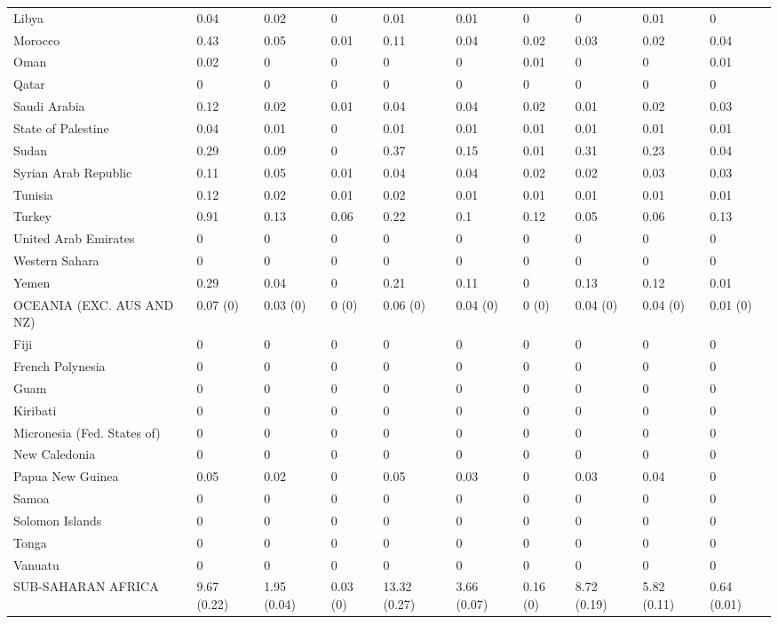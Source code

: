 \begin{longtable}[t]{llllllllll}
Libya & 0.04 & 0.02 & 0 & 0.01 & 0.01 & 0 & 0 & 0.01 & 0\\
Morocco & 0.43 & 0.05 & 0.01 & 0.11 & 0.04 & 0.02 & 0.03 & 0.02 & 0.04\\
Oman & 0.02 & 0 & 0 & 0 & 0 & 0.01 & 0 & 0 & 0.01\\
Qatar & 0 & 0 & 0 & 0 & 0 & 0 & 0 & 0 & 0\\
Saudi Arabia & 0.12 & 0.02 & 0.01 & 0.04 & 0.04 & 0.02 & 0.01 & 0.02 & 0.03\\
State of Palestine & 0.04 & 0.01 & 0 & 0.01 & 0.01 & 0.01 & 0.01 & 0.01 & 0.01\\
Sudan & 0.29 & 0.09 & 0 & 0.37 & 0.15 & 0.01 & 0.31 & 0.23 & 0.04\\
Syrian Arab Republic & 0.11 & 0.05 & 0.01 & 0.04 & 0.04 & 0.02 & 0.02 & 0.03 & 0.03\\
Tunisia & 0.12 & 0.02 & 0.01 & 0.02 & 0.01 & 0.01 & 0.01 & 0.01 & 0.01\\
Turkey & 0.91 & 0.13 & 0.06 & 0.22 & 0.1 & 0.12 & 0.05 & 0.06 & 0.13\\
United Arab Emirates & 0 & 0 & 0 & 0 & 0 & 0 & 0 & 0 & 0\\
Western Sahara & 0 & 0 & 0 & 0 & 0 & 0 & 0 & 0 & 0\\
Yemen & 0.29 & 0.04 & 0 & 0.21 & 0.11 & 0 & 0.13 & 0.12 & 0.01\\
OCEANIA (EXC. AUS AND NZ) & 0.07 (0) & 0.03 (0) & 0 (0) & 0.06 (0) & 0.04 (0) & 0 (0) & 0.04 (0) & 0.04 (0) & 0.01 (0)\\
Fiji & 0 & 0 & 0 & 0 & 0 & 0 & 0 & 0 & 0\\
French Polynesia & 0 & 0 & 0 & 0 & 0 & 0 & 0 & 0 & 0\\
Guam & 0 & 0 & 0 & 0 & 0 & 0 & 0 & 0 & 0\\
Kiribati & 0 & 0 & 0 & 0 & 0 & 0 & 0 & 0 & 0\\
Micronesia (Fed. States of) & 0 & 0 & 0 & 0 & 0 & 0 & 0 & 0 & 0\\
New Caledonia & 0 & 0 & 0 & 0 & 0 & 0 & 0 & 0 & 0\\
Papua New Guinea & 0.05 & 0.02 & 0 & 0.05 & 0.03 & 0 & 0.03 & 0.04 & 0\\
Samoa & 0 & 0 & 0 & 0 & 0 & 0 & 0 & 0 & 0\\
Solomon Islands & 0 & 0 & 0 & 0 & 0 & 0 & 0 & 0 & 0\\
Tonga & 0 & 0 & 0 & 0 & 0 & 0 & 0 & 0 & 0\\
Vanuatu & 0 & 0 & 0 & 0 & 0 & 0 & 0 & 0 & 0\\
SUB-SAHARAN AFRICA & 9.67 (0.22) & 1.95 (0.04) & 0.03 (0) & 13.32 (0.27) & 3.66 (0.07) & 0.16 (0) & 8.72 (0.19) & 5.82 (0.11) & 0.64 (0.01)\\

\end{longtable}
